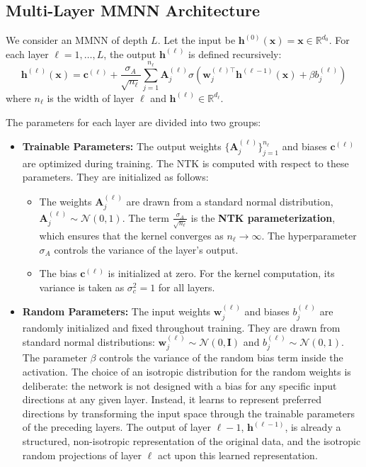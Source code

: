 \documentclass[a4paper]{article}
\begin{document}
\subsection{Multi-Layer MMNN Architecture}
We consider an MMNN of depth $L$. Let the input be $\bm{h}^{(0)}(\bm{x}) = \bm{x} \in \mathbb{R}^{d_0}$. For each layer $\ell = 1, \dots, L$, the output $\bm{h}^{(\ell)}$ is defined recursively:
\begin{equation}
    \bm{h}^{(\ell)}(\bm{x}) = \bm{c}^{(\ell)} + \frac{\sigma_A}{\sqrt{n_\ell}} \sum_{j=1}^{n_\ell} \bm{A}_j^{(\ell)} \sigma\left(\bm{w}_j^{(\ell)\top} \bm{h}^{(\ell-1)}(\bm{x}) + \beta b_j^{(\ell)}\right)
\end{equation}
where $n_\ell$ is the width of layer $\ell$ and $\bm{h}^{(\ell)} \in \mathbb{R}^{d_\ell}$.

The parameters for each layer are divided into two groups:
\begin{itemize}
    \item \textbf{Trainable Parameters:} The output weights $\{\bm{A}_j^{(\ell)}\}_{j=1}^{n_\ell}$ and biases $\bm{c}^{(\ell)}$ are optimized during training. The NTK is computed with respect to these parameters. They are initialized as follows:
    \begin{itemize}
        \item The weights $\bm{A}_j^{(\ell)}$ are drawn from a standard normal distribution, $\bm{A}_j^{(\ell)} \sim \mathcal{N}(0, 1)$. The term $\frac{\sigma_A}{\sqrt{n_\ell}}$ is the \textbf{NTK parameterization}, which ensures that the kernel converges as $n_\ell \to \infty$. The hyperparameter $\sigma_A$ controls the variance of the layer's output.
        \item The bias $\bm{c}^{(\ell)}$ is initialized at zero. For the kernel computation, its variance is taken as $\sigma_c^2 = 1$ for all layers.
    \end{itemize}
    \item \textbf{Random Parameters:} The input weights $\bm{w}_j^{(\ell)}$ and biases $b_j^{(\ell)}$ are randomly initialized and fixed throughout training. They are drawn from standard normal distributions: $\bm{w}_j^{(\ell)} \sim \mathcal{N}(0, \mathbf{I})$ and $b_j^{(\ell)} \sim \mathcal{N}(0, 1)$. The parameter $\beta$ controls the variance of the random bias term inside the activation. The choice of an isotropic distribution for the random weights is deliberate: the network is not designed with a bias for any specific input directions at any given layer. Instead, it learns to represent preferred directions by transforming the input space through the trainable parameters of the preceding layers. The output of layer $\ell-1$, $\bm{h}^{(\ell-1)}$, is already a structured, non-isotropic representation of the original data, and the isotropic random projections of layer $\ell$ act upon this learned representation.
\end{itemize}
\end{document}

